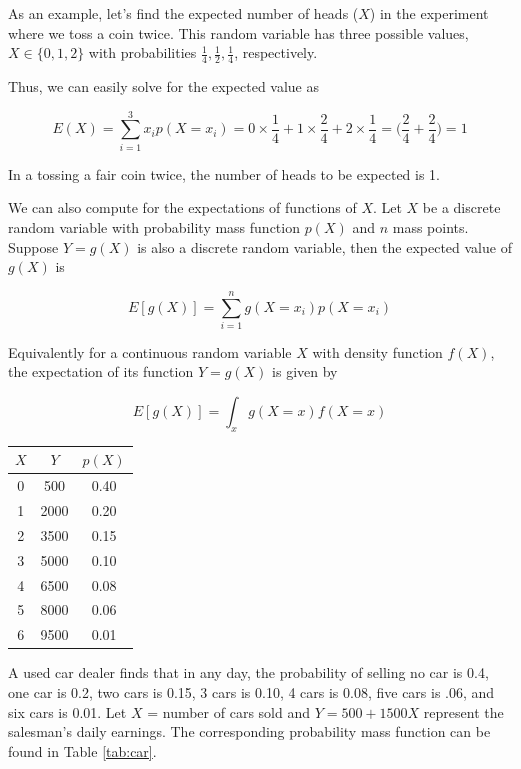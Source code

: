 \documentclass{article}
\begin{document}
As an example, let's find the expected number of heads ($X$) in the experiment where we toss a coin twice. This random variable has three possible values, $X \in \{0, 1, 2 \}$ with probabilities $\frac{1}{4}, \frac{1}{2}, \frac{1}{4}$, respectively.

Thus, we can easily solve for the expected value as

$$
E(X) = \sum_{i=1}^{3}{x_i p(X = x_i)} = 0 \times \frac{1}{4} + 1\times \frac{2}{4} + 2 \times \frac{1}{4} = \bigg(\frac{2}{4} + \frac{2}{4} \bigg) = 1
$$

In a tossing a fair coin twice, the number of heads to be expected is 1.


We can also compute for the expectations of functions of $X$. Let $X$ be a discrete random variable with probability mass function $p(X)$ and $n$ mass points. Suppose $Y=g(X)$ is also a discrete random variable, then the expected value of $g(X)$ is

$$
E[g(X)] = \sum_{i=1}^{n}{g(X = x_i)p(X = x_i)}
$$

Equivalently for a continuous random variable $X$ with density function $f(X)$, the expectation of its function $Y = g(X)$ is given by

$$
E[g(X)] = \int_{x}{g(X = x)f(X = x)}
$$

\begin{margintable}
\centering
\begin{tabular}{||c c c||} 
 \hline
 $X$ & $Y$ & $p(X)$ \\ [0.5ex] 
 \hline\hline
 0 & 500 & 0.40 \\ 
 1 & 2000 & 0.20 \\
 2 & 3500 & 0.15 \\
 3 & 5000 & 0.10 \\
 4 & 6500 & 0.08 \\
 5 & 8000 & 0.06 \\
 6 & 9500 & 0.01 \\ [1ex] 
 \hline
\end{tabular}
\captionsetup{justification=centering}
\caption{\label{tab:car} Number of cars sold ($X$) and daily earnings ($Y$) of a used car salesman.}
\end{margintable}

A used car dealer finds that in any day, the probability of selling no car is 0.4, one car is 0.2, two cars is 0.15, 3 cars is 0.10, 4 cars is 0.08, five cars is .06, and six cars is 0.01. Let $X$ = number of cars sold and $Y = 500 + 1500X$ represent the salesman’s daily earnings. The corresponding probability mass function can be found in Table \ref{tab:car}.
\end{document}

